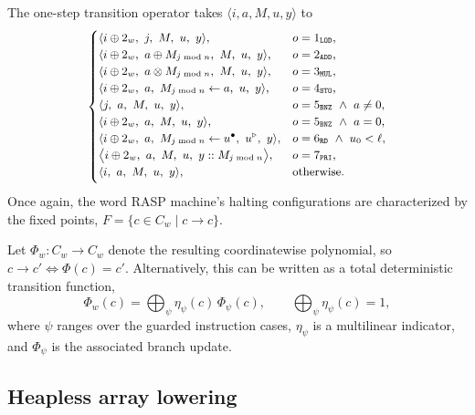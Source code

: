\documentclass[sigplan,nonacm]{acmart}\settopmatter{printfolios=false,printccs=false,printacmref=false}
\begin{document}
\noindent The one-step transition operator takes $\langle i, a, M, u, y\rangle$ to
\[
  \small
  \begin{cases}
    \langle i\oplus 2_w,\ j,\ M,\ u,\ y\rangle,
    & o=1_\texttt{LOD},\\
    \langle i\oplus 2_w,\ a\oplus M_{j\bmod n},\ M,\ u,\ y\rangle,
    & o=2_\texttt{ADD},\\
    \langle i\oplus 2_w,\ a\otimes M_{j\bmod n},\ M,\ u,\ y\rangle,
    & o=3_\texttt{MUL},\\
    \langle i\oplus 2_w,\ a,\ M_{j\bmod n}\gets a,\ u,\ y\rangle,
    & o=4_\texttt{STO},\\
    \langle j,\ a,\ M,\ u,\ y\rangle,
    & o=5_\texttt{BNZ}\ \wedge\ a \neq 0,\\
    \langle i\oplus 2_w,\ a,\ M,\ u,\ y\rangle,
    & o=5_\texttt{BNZ}\ \wedge\ a = 0,\\
    \langle i\oplus 2_w,\ a,\ M_{j\bmod n}\gets u^\bullet,\ u^\triangleright,\ y\rangle,
    & o=6_\texttt{RD}\ \wedge\ u_0< \ell,\\
    \big\langle i\oplus 2_w,\ a,\ M,\ u,\ y :: M_{j\bmod n}\big\rangle,
    & o=7_\texttt{PRI},\\
    \langle i,\ a,\ M,\ u,\ y\rangle,
    & \text{otherwise.}\vspace{0.1cm}
  \end{cases}
\]
\noindent Once again, the word RASP machine's halting configurations are characterized by the fixed points, $F = \{c \in C_w \mid c \rightarrow c\}$.

Let \( \Phi_w :C_w\to C_w \) denote the resulting coordinatewise polynomial, so \(c\to c' \iff \Phi(c)=c'\). Alternatively, this can be written as a total deterministic transition function,
\[
\Phi_w(c)=\bigoplus_{\psi}\eta_\psi(c)\,\Phi_\psi(c), \qquad \bigoplus_{\psi}\eta_\psi(c) = 1,
\]
where \(\psi\) ranges over the guarded instruction cases, \(\eta_\psi\) is a multilinear indicator, and \(\Phi_\psi\) is the associated branch update.

\subsection{Heapless array lowering}\label{sec:heapless}
\end{document}
